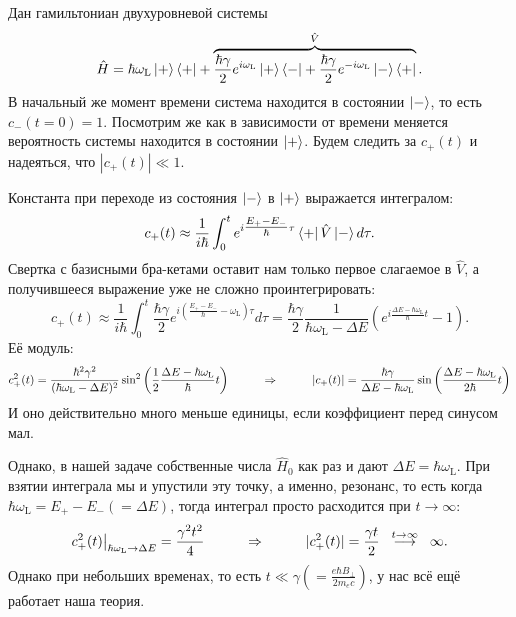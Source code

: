 Дан гамильтониан двухуровневой системы
\begin{equation*}
	\hat{H} = \hbar \omega_\text{L} \left| + \right\rangle \left\langle + \right| + \overbrace{\frac{\hbar \gamma}{2} e^{i \omega_\text{L}} \left| + \right\rangle \left\langle - \right| + \frac{\hbar \gamma}{2}  e^{-i \omega_\text{L}} \left| - \right\rangle \left\langle + \right|}^{\hat{V}}.
\end{equation*}
В начальный же момент времени система находится в состоянии $\left| - \right\rangle$, то есть $c_{-}(t = 0) = 1$. Посмотрим же как в зависимости от времени меняется вероятность системы находится в состоянии $\left| + \right\rangle$. Будем следить за $c_{+}(t)$ и надеяться, что $|c_{+}(t)|\ll 1$.

Константа при переходе из состояния $\left| - \right\rangle$ в $\left| + \right\rangle$ выражается интегралом:
\begin{equation*}
	c_{+} (t) \approx \frac{1}{i \hbar} \int_{0}^{t} e^{i\tfrac{E_+ - E_-}{\hbar}\tau} \left\langle + \right| \hat{V} \left| - \right\rangle d \tau.
\end{equation*}
Свертка с базисными бра-кетами оставит нам только первое слагаемое в $\hat{V}$, а получившееся выражение уже не сложно проинтегрировать:
\begin{equation*}
	c_{+} (t) \approx \frac{1}{i \hbar} \int_{0}^{t} \frac{\hbar \gamma}{2} e^{i\left(\frac{E_+ - E_-}{\hbar}- \omega_\text{L}\right)\tau} d \tau
	=
	\frac{\hbar \gamma}{2} \frac{1}{\hbar\omega_\text{L} - \Delta E} \left(e^{i \frac{\Delta E - \hbar \omega_\text{L}}{\hbar}t} - 1\right).
\end{equation*}
Её модуль:
\begin{equation*}
	c_+^2(t) = \frac{\hbar^2 \gamma^2}{(\hbar\omega_\text{L} - \Delta E)^2} \sin^2 \left(\frac{1}{2} \frac{\Delta E - \hbar \omega_\text{L}}{\hbar} t\right)
	\hspace{1 cm}
	\Rightarrow
	\hspace{1 cm}
	|c_+(t)| = \frac{\hbar \gamma}{\Delta E -\hbar\omega_\text{L}} \sin \left(\frac{\Delta E - \hbar \omega_\text{L}}{2\hbar} t\right)
\end{equation*}
И оно действительно много меньше единицы, если коэффициент перед синусом мал.

Однако, в нашей задаче собственные числа $\hat{H}_0$ как раз и дают $\Delta E = \hbar \omega_\text{L}$. При взятии интеграла мы и упустили эту точку, а именно, резонанс, то есть когда $\hbar\omega_\text{L} = E_+ - E_- (= \Delta E)$, тогда интеграл просто расходится при $t \to \infty$:
\begin{equation*}
	c_+^2(t)\big|_{\hbar \omega_\text{L} \to \Delta E} = \frac{\gamma^2 t^2}{4}
	\hspace{1 cm}
	\Rightarrow
	\hspace{1 cm}
	|c_+^2(t)| = \frac{\gamma t}{2} 
	\hspace{0.2 cm}
	\overset{t \to \infty}{\longrightarrow} 
	\hspace{0.2 cm}
	\infty.
\end{equation*}
Однако при небольших временах, то есть $t \ll \gamma \left(= \frac{e \hbar B_\bot}{2 m_e c}\right)$, у нас всё ещё работает наша теория.